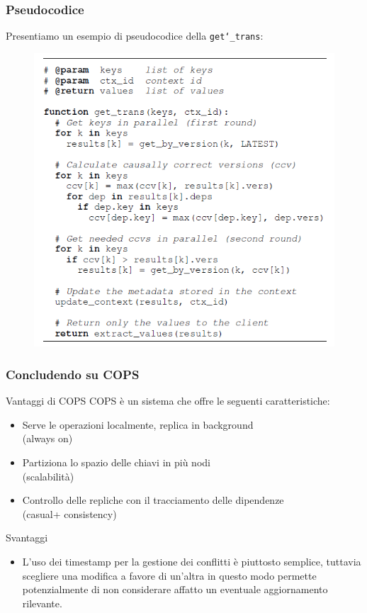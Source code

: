 \begin{frame}
\frametitle{Pseudocodice}
Presentiamo un esempio di pseudocodice della \texttt{get\char`_trans}:
\begin{figure}
	\centering
	\includegraphics[scale=0.40]{COPS/COPS5.png}
\end{figure}
\end{frame}

\begin{frame}
\frametitle{Concludendo su COPS}
\begin{block}{Vantaggi di COPS}
COPS è un sistema che offre le seguenti caratteristiche:
	\begin{itemize}
		\item<1-> Serve le operazioni localmente, replica in background \\
				  (always on)
		\item<1-> Partiziona lo spazio delle chiavi in più nodi \\
				  (scalabilità)
		\item<1-> Controllo delle repliche con il tracciamento delle dipendenze \\
				  (casual+ consistency)
	\end{itemize}
\end{block}
\begin{block}{Svantaggi}
	\begin{itemize}
		\item L'uso dei timestamp per la gestione dei conflitti è piuttosto semplice,
			  tuttavia scegliere una modifica a favore di un'altra in questo modo
			  permette potenzialmente di non considerare affatto un eventuale aggiornamento
			  rilevante.
	\end{itemize}
\end{block}
\end{frame}
